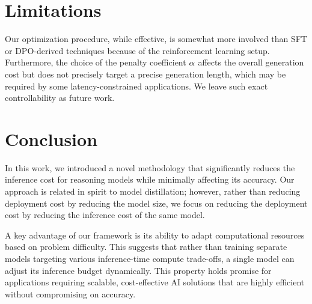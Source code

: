 \section{Limitations}
Our optimization procedure, while effective, is somewhat more involved than SFT or DPO-derived techniques because of the reinforcement learning setup.
Furthermore, the choice of the penalty coefficient $\alpha$ affects the overall generation cost but does not precisely target a precise generation length, which may be required by some latency-constrained applications. We leave such exact controllability as future work.


\section{Conclusion}

In this work, we introduced a novel methodology that significantly reduces the inference cost for reasoning models while minimally affecting its accuracy. 
Our approach is related in spirit to model distillation; however, rather than reducing deployment cost by reducing the model size, we focus on reducing the deployment cost by reducing the inference cost of the same model. 

A key advantage of our framework is its ability to adapt computational resources based on problem difficulty. This suggests that rather than training separate models targeting various  inference-time compute trade-offs, a single model can adjust its inference budget dynamically. This property holds promise for applications requiring scalable, cost-effective AI solutions that are highly efficient without compromising on accuracy. 
